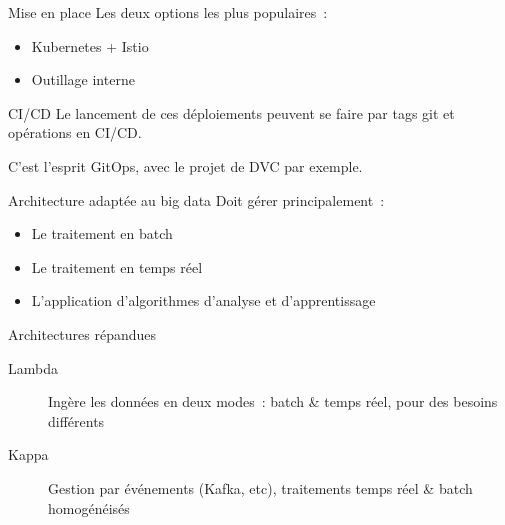\begin{frame}{Mise en place}
  Les deux options les plus populaires~:
  \begin{itemize}
    \item Kubernetes + Istio
    \item Outillage interne
  \end{itemize}
\end{frame}

\begin{frame}{CI/CD}
  Le lancement de ces déploiements peuvent se faire par tags git et opérations en CI/CD.

  C'est l'esprit GitOps, avec le projet  de DVC par exemple.
\end{frame}

\begin{frame}{Architecture adaptée au big data}
  Doit gérer principalement~:

  \begin{itemize}
    \item Le traitement en batch
    \item Le traitement en temps réel
    \item L'application d'algorithmes d'analyse et d'apprentissage
  \end{itemize}
\end{frame}

\begin{frame}{Architectures répandues}
  \begin{description}
    \item[Lambda] Ingère les données en deux modes~: batch \& temps réel, pour des besoins différents
    \item[Kappa] Gestion par événements (Kafka, etc), traitements temps réel \& batch homogénéisés
  \end{description}
\end{frame}
